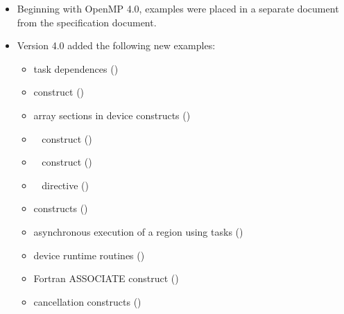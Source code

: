 \begin{itemize}
\item Beginning with OpenMP 4.0, examples were placed in a separate document
      from the specification document.
\item Version 4.0 added the following new examples:

\begin{itemize}
\item task dependences                       ()
\item {} construct                ()
\item array sections in device constructs    ()
\item {}~ construct    ()
\item {}~ construct  ()
\item {}~ directive ()
\item {} constructs                ()
\item asynchronous execution of a  region using tasks ()
\item device runtime routines                ()
\item Fortran ASSOCIATE construct            ()
\item cancellation constructs                ()
\end{itemize}

\end{itemize}
